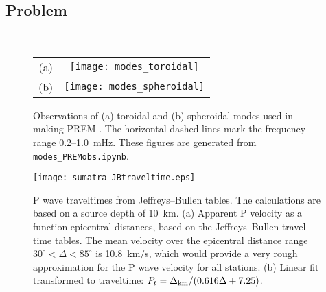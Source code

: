\documentclass[11pt,titlepage,fleqn]{article}
\begin{document}

\subsection*{Problem} \howmuchtime\



\clearpage\pagebreak


\clearpage\pagebreak
\begin{figure}
\centering
\begin{tabular}{cc}
(a) & \texttt{[image: modes\_toroidal]} \\
(b) & \texttt{[image: modes\_spheroidal]}
\end{tabular}
\caption[]
{{
Observations of (a) toroidal and (b) spheroidal modes used in making PREM \citep{PREM}.
The horizontal dashed lines mark the frequency range 0.2--1.0~mHz.
These figures are generated from {\tt modes\_PREMobs.ipynb}.
}}
\label{fig:premmodes}
\end{figure}

\clearpage\pagebreak
\begin{figure}
\centering
\texttt{[image: sumatra\_JBtraveltime.eps]}
\caption[]
{{
P wave traveltimes from Jeffreys--Bullen tables.
The calculations are based on a source depth of 10~km.
(a) Apparent P velocity as a function epicentral distances, based on the Jeffreys--Bullen travel time tables. 
The mean velocity over the epicentral distance range $30^\circ < \Delta < 85^\circ$ is 10.8~km/s, which would provide a very rough approximation for the P wave velocity for all stations.
(b) Linear fit transformed to traveltime: $P_t = \Delta_{\rm km} / (0.616 \Delta + 7.25)$.
}}
\label{fig:JB}
\end{figure}



\end{document}
